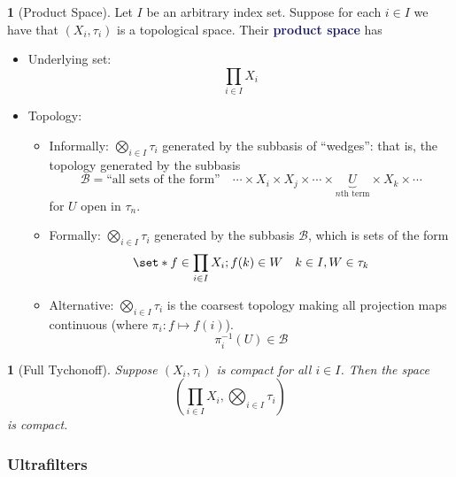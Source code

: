 \documentclass[11pt]{article}
\numberwithin{equation}{section}
\newcommand{\navy}[1]{\textcolor{MidnightBlue}{\bf #1}}
\theoremstyle{plain}
\newtheorem{theorem}{\color{ForestGreen}{\textbf{Theorem}}}[section]
\theoremstyle{definition}
\newtheorem{definition}{\color{MidnightBlue}{\textbf{Definition}}}[section]
\newcommand\parens[1]{\left( #1 \right)}
\def\Set{\set*}%
\newcommand{\1}{\mathbbm 1}
\def\t{\tau}
\newcommand{\bB}{\mathcal B}
\begin{document}
\begin{definition}[Product Space]
	Let $I$ be an arbitrary index set. Suppose for each $i \in I$ we have that $(X_i, \t_i)$ is a topological space. Their \navy{product space} has
	\begin{itemize}
		\item Underlying set:
		\begin{equation}
			\prod_{i \in I} X_i
		\end{equation}
		\item Topology: 
		\begin{itemize}
			\item Informally: $\bigotimes_{i \in I} \t_i$ generated by the subbasis of ``wedges'': that is, the topology generated by the subbasis
			\begin{equation}
				\bB = \text{``all sets of the form''} \quad \cdots \times X_i \times X_j \times \cdots \times \underbrace{U}_{n \text{th term}} \times X_k \times \cdots  	
			\end{equation} 
			for $U$ open in $\t_n$.
			\item Formally: $\bigotimes_{i \in I} \t_i$ generated by the subbasis $\bB$, which is sets of the form 
			\begin{equation}
				\Set{f \in \prod_{i \in I} X_i; f(k) \in W} \quad k \in I, W \in \t_k
			\end{equation}
			\item Alternative: $\bigotimes_{i \in I} \t_i$ is the coarsest topology making all projection maps continuous (where $\pi_i: f \mapsto f(i)$).
			\begin{equation}
				\pi_i^{-1}(U) \in \bB
			\end{equation}
		\end{itemize}
	\end{itemize}
\end{definition}

\begin{theorem}[Full Tychonoff]
	Suppose $(X_i,\t_i)$ is compact for all $i \in I$. Then the space 
	\begin{equation}
		\parens{\prod_{i \in I} X_i, \bigotimes_{i \in I} \t_i}
	\end{equation}
	is compact. 
\end{theorem}

\subsubsection{Ultrafilters}
\end{document}
